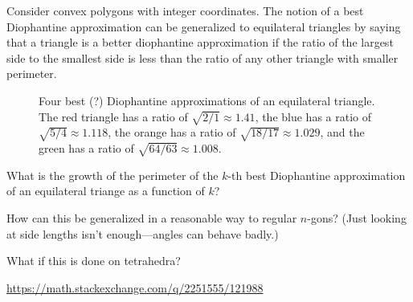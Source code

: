 \documentclass{article}
\begin{document}
Consider convex polygons with integer coordinates. The notion of a best
Diophantine approximation can be generalized to equilateral triangles by
saying that a triangle is a better diophantine approximation if
the ratio of the largest side to the smallest side is less than the ratio of
any other triangle with smaller perimeter.
\begin{figure}[ht!]
  \centering
  \caption{
    Four best (?) Diophantine approximations of an equilateral triangle.
    The red triangle has a ratio of $\sqrt{2/1} \approx 1.41$,
    the blue has a ratio of $\sqrt{5/4} \approx 1.118$,
    the orange has a ratio of $\sqrt{18/17} \approx 1.029$, and
    the green has a ratio of $\sqrt{64/63} \approx 1.008$.
  }
\end{figure}
\begin{question}
  What is the growth of the perimeter of the $k$-th best Diophantine
  approximation of an equilateral triange as a function of $k$?
\end{question}

\begin{related}
  \item How can this be generalized in a reasonable way to regular $n$-gons?
    (Just looking at side lengths isn't enough---angles can behave badly.)
  \item What if this is done on tetrahedra?
\end{related}
\begin{references}
  \item \url{https://math.stackexchange.com/q/2251555/121988}
\end{references}
\end{document}
